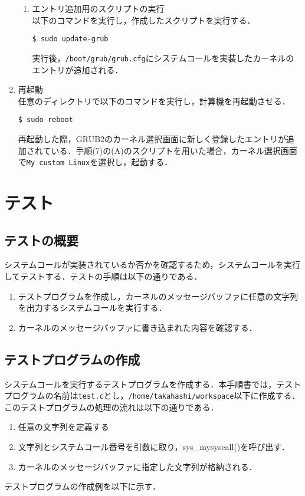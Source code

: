 \documentclass[12pt]{jsarticle}
\begin{document}
\begin{enumerate}
\begin{enumerate}
\item エントリ追加用のスクリプトの実行\\
  以下のコマンドを実行し，作成したスクリプトを実行する．
\begin{verbatim}
$ sudo update-grub
\end{verbatim}
実行後，\verb|/boot/grub/grub.cfg|にシステムコールを実装したカーネルのエントリが追加される．
  \end{enumerate}
  
\item 再起動 \\
  任意のディレクトリで以下のコマンドを実行し，計算機を再起動させる．
\begin{verbatim}
$ sudo reboot
\end{verbatim}
再起動した際，GRUB2のカーネル選択画面に新しく登録したエントリが追加されている．手順(7)の(A)のスクリプトを用いた場合，カーネル選択画面で\verb|My custom Linux|を選択し，起動する．

\end{enumerate}

\section{テスト}
\label{sec:test}
\subsection{テストの概要}
システムコールが実装されているか否かを確認するため，システムコールを実行してテストする．テストの手順は以下の通りである．

\begin{enumerate}
\item テストプログラムを作成し，カーネルのメッセージバッファに任意の文字列を出力するシステムコールを実行する．
\item カーネルのメッセージバッファに書き込まれた内容を確認する．
\end{enumerate}

\subsection{テストプログラムの作成}
システムコールを実行するテストプログラムを作成する．本手順書では，テストプログラムの名前は\verb|test.c|とし，\verb|/home/takahashi/workspace|以下に作成する．このテストプログラムの処理の流れは以下の通りである．

\begin{enumerate}
\item 任意の文字列を定義する
\item 文字列とシステムコール番号を引数に取り，sys\_mysyscall()を呼び出す．
\item カーネルのメッセージバッファに指定した文字列が格納される．
\end{enumerate}
テストプログラムの作成例を以下に示す．
\end{document}
